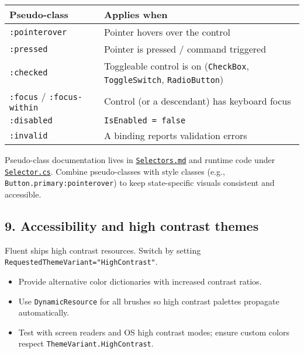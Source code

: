 \begin{longtable}[]{@{}
  >{\raggedright\arraybackslash}p{}
  >{\raggedright\arraybackslash}p{}@{}}
\toprule\noalign{}
\begin{minipage}[b]{\linewidth}\raggedright
Pseudo-class
\end{minipage} & \begin{minipage}[b]{\linewidth}\raggedright
Applies when
\end{minipage} \\
\midrule\noalign{}
\endhead
\bottomrule\noalign{}
\endlastfoot
\passthrough{\lstinline!:pointerover!} & Pointer hovers over the
control \\
\passthrough{\lstinline!:pressed!} & Pointer is pressed / command
triggered \\
\passthrough{\lstinline!:checked!} & Toggleable control is on
(\passthrough{\lstinline!CheckBox!},
\passthrough{\lstinline!ToggleSwitch!},
\passthrough{\lstinline!RadioButton!}) \\
\passthrough{\lstinline!:focus!} /
\passthrough{\lstinline!:focus-within!} & Control (or a descendant) has
keyboard focus \\
\passthrough{\lstinline!:disabled!} &
\passthrough{\lstinline!IsEnabled = false!} \\
\passthrough{\lstinline!:invalid!} & A binding reports validation
errors \\
\end{longtable}

Pseudo-class documentation lives in
\href{https://github.com/AvaloniaUI/Avalonia/blob/master/docs/styles/selectors.md}{\passthrough{\lstinline!Selectors.md!}}
and runtime code under
\href{https://github.com/AvaloniaUI/Avalonia/blob/master/src/Avalonia.Styling/Selector.cs}{\passthrough{\lstinline!Selector.cs!}}.
Combine pseudo-classes with style classes (e.g.,
\passthrough{\lstinline!Button.primary:pointerover!}) to keep
state-specific visuals consistent and accessible.

\subsection{9. Accessibility and high contrast
themes}\label{accessibility-and-high-contrast-themes}

Fluent ships high contrast resources. Switch by setting
\passthrough{\lstinline!RequestedThemeVariant="HighContrast"!}.

\begin{itemize}
\tightlist
\item
  Provide alternative color dictionaries with increased contrast ratios.
\item
  Use \passthrough{\lstinline!DynamicResource!} for all brushes so high
  contrast palettes propagate automatically.
\item
  Test with screen readers and OS high contrast modes; ensure custom
  colors respect \passthrough{\lstinline!ThemeVariant.HighContrast!}.
\end{itemize}

